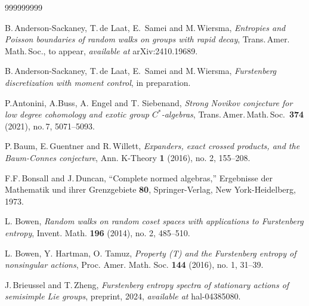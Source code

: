 \documentclass[12pt]{amsart}
\theoremstyle{definition}
\theoremstyle{remark}
\numberwithin{equation}{section}
\begin{document}
\begin{thebibliography}{999999999}

 B.\,Anderson-Sackaney, T.\,de Laat, E.\, Samei and M.\,Wiersma, \emph{Entropies and Poisson boundaries of random walks on groups with rapid decay}, Trans.\,Amer.\,Math.\,Soc., to appear, \emph{available at} arXiv:2410.19689.

  B.\,Anderson-Sackaney, T.\,de Laat, E.\, Samei and M.\,Wiersma, \emph{Furstenberg discretization with moment control}, in preparation.

 P.Antonini, A.Buss, A. Engel and T. Siebenand, {\it Strong Novikov conjecture for low degree cohomology and exotic group $C^*$-algebras}, Trans.\,Amer.\,Math.\,Soc.\ \textbf{374}  (2021), no.\,7, 5071--5093.

 P.\,Baum, E.\,Guentner and R.\,Willett,
{\it Expanders, exact crossed products, and the Baum-Connes conjecture},
Ann. K-Theory \textbf{1} (2016), no. 2, 155--208.



 F.F.\,Bonsall and J.\,Duncan, ``Complete normed algebras,'' Ergebnisse der Mathematik und ihrer Grenzgebiete \textbf{80}, Springer-Verlag, New York-Heidelberg, 1973. 

 L. Bowen, {\it Random walks on random coset spaces with applications to Furstenberg entropy}, Invent. Math. \textbf{196} (2014), no. 2, 485--510.

 L. Bowen, Y. Hartman, O. Tamuz, {\it Property (T) and the Furstenberg entropy of nonsingular actions},
Proc. Amer. Math. Soc. \textbf{144} (2016), no. 1, 31--39.




 J.\,Brieussel and T.\,Zheng, {\it Furstenberg entropy spectra of stationary actions of semisimple Lie
groups}, preprint, 2024, \emph{available at} hal-04385080.


\end{thebibliography}
\end{document}
